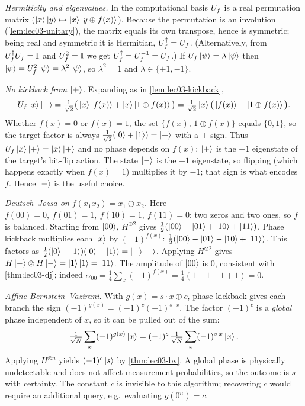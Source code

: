 \begin{solution}
\emph{Hermiticity and eigenvalues.} In the computational basis $U_{f}$ is a real
permutation matrix ($\ket{x}\ket{y}\mapsto\ket{x}\ket{y\oplus f(x)}$). Because the
permutation is an involution (\cref{lem:lec03-unitary}), the matrix equals its own
transpose, hence is symmetric; being real and symmetric it is Hermitian,
$U_{f}^{\dagger}=U_{f}$. (Alternatively, from $U_{f}^{\dagger}U_{f}=\mathbb{I}$ and $U_{f}^2=\mathbb{I}$ we get
$U_{f}^{\dagger}=U_{f}^{-1}=U_{f}$.) If $U_{f}\ket{\psi}=\lambda\ket{\psi}$ then
$\ket{\psi}=U_{f}^2\ket{\psi}=\lambda^2\ket{\psi}$, so $\lambda^2=1$ and
$\lambda\in\{+1,-1\}$.

\emph{No kickback from $\ket{+}$.} Expanding as in \cref{lem:lec03-kickback},
\[
  U_{f}\ket{x}\ket{+}
  =\tfrac{1}{\sqrt2}\big(\ket{x}\ket{f(x)}+\ket{x}\ket{1\oplus f(x)}\big)
  =\tfrac{1}{\sqrt2}\ket{x}\big(\ket{f(x)}+\ket{1\oplus f(x)}\big).
\]
Whether $f(x)=0$ or $f(x)=1$, the set $\{f(x),\,1\oplus f(x)\}$ equals $\{0,1\}$, so
the target factor is always $\tfrac{1}{\sqrt2}(\ket0+\ket1)=\ket{+}$ with a $+$
sign. Thus $U_{f}\ket{x}\ket{+}=\ket{x}\ket{+}$ and no phase depends on $f(x)$:
$\ket{+}$ is the $+1$ eigenstate of the target's bit-flip action. The state
$\ket{-}$ is the $-1$ eigenstate, so flipping (which happens exactly when $f(x)=1$)
multiplies it by $-1$; that sign is what encodes $f$. Hence $\ket{-}$ is the useful
choice.
\end{solution}

\begin{solution}
\emph{Deutsch--Jozsa on $f(x_1x_2)=x_1\oplus x_2$.} Here $f(00)=0,\ f(01)=1,\
f(10)=1,\ f(11)=0$: two zeros and two ones, so $f$ is balanced. Starting from
$\ket{00}$, $H^{\otimes2}$ gives
$\tfrac12(\ket{00}+\ket{01}+\ket{10}+\ket{11})$. Phase kickback multiplies each
$\ket{x}$ by $(-1)^{f(x)}$:
$\tfrac12(\ket{00}-\ket{01}-\ket{10}+\ket{11})$. This factors as
$\tfrac12(\ket0-\ket1)(\ket0-\ket1)=\ket{-}\ket{-}$. Applying $H^{\otimes2}$ gives
$H\ket{-}\otimes H\ket{-}=\ket1\ket1=\ket{11}$. The amplitude of $\ket{00}$ is $0$,
consistent with \cref{thm:lec03-dj}; indeed
$\alpha_{00}=\tfrac14\sum_x(-1)^{f(x)}=\tfrac14(1-1-1+1)=0$.

\emph{Affine Bernstein--Vazirani.} With $g(x)=s\cdot x\oplus c$, phase kickback gives
each branch the sign $(-1)^{g(x)}=(-1)^{c}(-1)^{s\cdot x}$. The factor $(-1)^c$ is a
\emph{global} phase independent of $x$, so it can be pulled out of the sum:
\[
  \tfrac{1}{\sqrt N}\sum_x(-1)^{g(x)}\ket{x}
  =(-1)^{c}\,\tfrac{1}{\sqrt N}\sum_x(-1)^{s\cdot x}\ket{x}.
\]
Applying $H^{\otimes n}$ yields $(-1)^{c}\ket{s}$ by \cref{thm:lec03-bv}. A global
phase is physically undetectable and does not affect measurement probabilities, so
the outcome is $s$ with certainty. The constant $c$ is invisible to this algorithm;
recovering $c$ would require an additional query, e.g.\ evaluating $g(0^n)=c$.
\end{solution}

